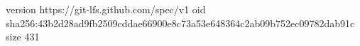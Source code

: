version https://git-lfs.github.com/spec/v1
oid sha256:43b2d28ad9fb2509cddae66900e8c73a53e648364c2ab09b752ec09782dab91c
size 431
